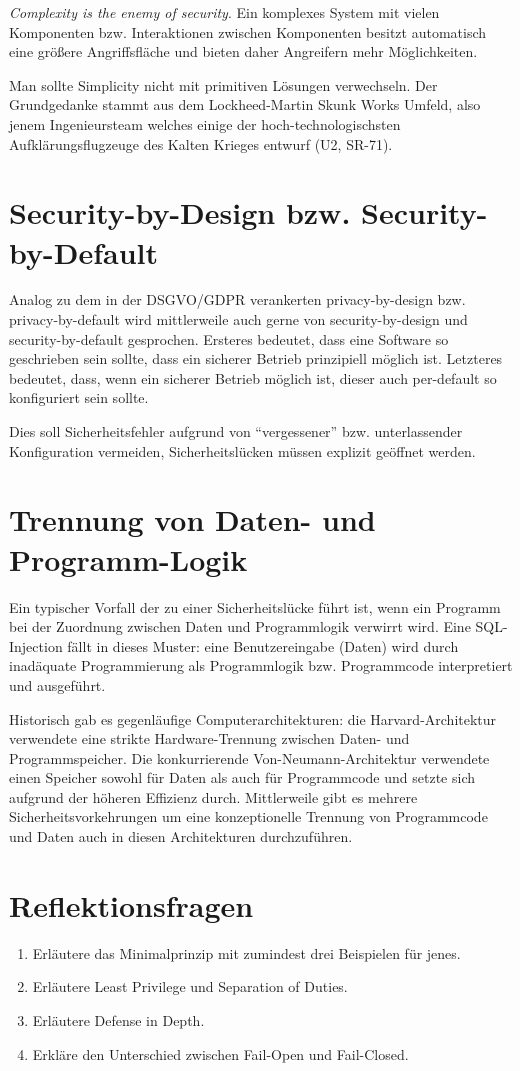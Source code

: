 \textit{Complexity is the enemy of security}. Ein komplexes System mit vielen Komponenten bzw. Interaktionen zwischen Komponenten besitzt automatisch eine größere Angriffsfläche und bieten daher Angreifern mehr Möglichkeiten.

Man sollte Simplicity nicht mit primitiven Lösungen verwechseln. Der Grundgedanke stammt aus dem Lockheed-Martin Skunk Works Umfeld, also jenem Ingenieursteam welches einige der hoch-technologischsten Aufklärungsflugzeuge des Kalten Krieges entwurf (U2, SR-71).

\section{Security-by-Design bzw. Security-by-Default}

Analog zu dem in der DSGVO/GDPR verankerten privacy-by-design bzw. privacy-by-default wird mittlerweile auch gerne von security-by-design und security-by-default gesprochen. Ersteres bedeutet, dass eine Software so geschrieben sein sollte, dass ein sicherer Betrieb prinzipiell möglich ist. Letzteres bedeutet, dass, wenn ein sicherer Betrieb möglich ist, dieser auch per-default so konfiguriert sein sollte.

Dies soll Sicherheitsfehler aufgrund von ``vergessener'' bzw. unterlassender Konfiguration vermeiden, Sicherheitslücken müssen explizit geöffnet werden.

\section{Trennung von Daten- und Programm-Logik}

Ein typischer Vorfall der zu einer Sicherheitslücke führt ist, wenn ein Programm bei der Zuordnung zwischen Daten und Programmlogik verwirrt wird. Eine SQL-Injection fällt in dieses Muster: eine Benutzereingabe (Daten) wird durch inadäquate Programmierung als Programmlogik bzw. Programmcode interpretiert und ausgeführt.

Historisch gab es gegenläufige Computerarchitekturen: die Harvard-Architektur verwendete eine strikte Hardware-Trennung zwischen Daten- und Programmspeicher. Die konkurrierende Von-Neumann-Architektur verwendete einen Speicher sowohl für Daten als auch für Programmcode und setzte sich aufgrund der höheren Effizienz durch. Mittlerweile gibt es mehrere Sicherheitsvorkehrungen um eine konzeptionelle Trennung von Programmcode und Daten auch in diesen Architekturen durchzuführen.

\section{Reflektionsfragen}

\begin{enumerate}
	\item Erläutere das Minimalprinzip mit zumindest drei Beispielen für jenes.
	\item Erläutere Least Privilege und Separation of Duties.
	\item Erläutere Defense in Depth.
	\item Erkläre den Unterschied zwischen Fail-Open und Fail-Closed.
\end{enumerate}
